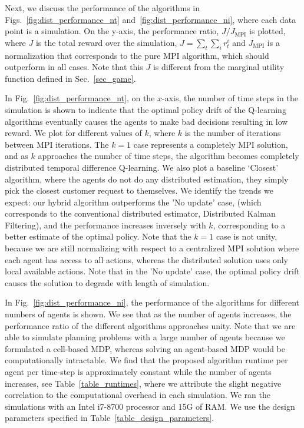 \documentclass[journal]{IEEEtran}
\begin{document}
Next, we discuss the performance of the algorithms in Figs.~\ref{fig:dist_performance_nt} and~\ref{fig:dist_performance_ni}, where each data point is a simulation. On the y-axis, the performance ratio, $J/J_\mathrm{MPI}$ is plotted, where $J$ is the total reward over the simulation, $J = \sum_t \sum_i r^i_t$ and $J_\mathrm{MPI}$ is a normalization that corresponds to the pure MPI algorithm, which should outperform in all cases. Note that this $J$ is different from the marginal utility function defined in Sec.~\ref{sec_game}. 

In Fig.~\ref{fig:dist_performance_nt}, on the $x$-axis, the number of time steps in the simulation is shown to indicate that the optimal policy drift of the Q-learning algorithms eventually causes the agents to make bad decisions resulting in low reward. We plot for different values of $k$, where $k$ is the number of iterations between MPI iterations. The $k = 1$ case represents a completely MPI solution, and as $k$ approaches the number of time steps, the algorithm becomes completely distributed temporal difference Q-learning. We also plot a baseline `Closest' algorithm, where the agents do not do any distributed estimation, they simply pick the closest customer request to themselves. We identify the trends we expect: our hybrid algorithm outperforms the 'No update' case, (which corresponds to the conventional distributed estimator, Distributed Kalman Filtering), and the performance increases inversely with $k$, corresponding to a better estimate of the optimal policy. Note that the $k=1$ case is not unity, because we are still normalizing with respect to a centralized MPI solution where each agent has access to all actions, whereas the distributed solution uses only local available actions. Note that in the 'No update' case, the optimal policy drift causes the solution to degrade with length of simulation. 

In Fig.~\ref{fig:dist_performance_ni}, the performance of the algorithms for different numbers of agents is shown. We see that as the number of agents increases, the performance ratio of the different algorithms approaches unity. Note that we are able to simulate planning problems with a large number of agents because we formulated a cell-based MDP, whereas solving an agent-based MDP would be computationally intractable. We find that the proposed algorithm runtime per agent per time-step is approximately constant while the number of agents increases, see Table~\ref{table_runtimes}, where we attribute the slight negative correlation to the computational overhead in each simulation. We ran the simulations with an Intel i7-8700 processor and 15G of RAM. We use the design parameters specified in Table~\ref{table_design_parameters}. 
\end{document}
